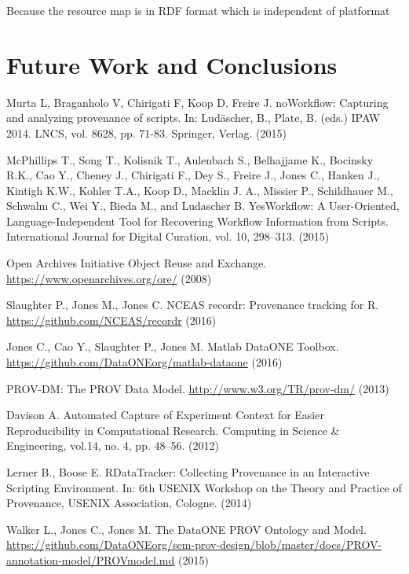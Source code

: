 \documentclass[runningheads,a4paper]{llncs}
\begin{document}
{Because the resource map is in RDF format which is independent of platformat 



\section{Future Work and Conclusions}   \label{future-work-conclusion}




\begin{thebibliography}{4}

 Murta L, Braganholo V, Chirigati F, Koop D, Freire J. noWorkflow: Capturing and analyzing provenance of scripts. In: Lud{\"a}scher, B., Plate, B. (eds.) IPAW 2014. LNCS, vol. 8628,  pp. 71-83. Springer, Verlag. (2015)

 McPhillips T., Song T., Kolisnik T., Aulenbach S., Belhajjame K., Bocinsky R.K., Cao Y., Cheney J., Chirigati F., Dey S., Freire J., Jones C., Hanken J., Kintigh K.W., Kohler T.A., Koop D., Macklin J. A., Missier P., Schildhauer M., Schwalm C., Wei Y., Bieda M., and Ludascher B. YesWorkflow: A User-Oriented, Language-Independent Tool for Recovering Workflow Information from Scripts. International Journal for Digital Curation, vol. 10, 298--313. (2015)

 Open Archives Initiative Object Reuse and Exchange. \url{https://www.openarchives.org/ore/} (2008)

 Slaughter P., Jones M., Jones C. NCEAS recordr: Provenance tracking for R. \url{https://github.com/NCEAS/recordr} (2016)

 Jones C., Cao Y., Slaughter P., Jones M. Matlab DataONE Toolbox. \url{https://github.com/DataONEorg/matlab-dataone} (2016)

 PROV-DM: The PROV Data Model. \url{http://www.w3.org/TR/prov-dm/} (2013)

 Davison A. Automated Capture of Experiment Context for Easier Reproducibility in Computational Research. Computing in Science \& Engineering, vol.14, no. 4, pp. 48--56. (2012)

 Lerner B., Boose E. RDataTracker: Collecting Provenance in an Interactive Scripting Environment. In: 6th USENIX Workshop on the Theory and Practice of Provenance, USENIX Association, Cologne. (2014)

 Walker L., Jones C., Jones M. The DataONE PROV Ontology and Model. \url{https://github.com/DataONEorg/sem-prov-design/blob/master/docs/PROV-annotation-model/PROVmodel.md} (2015)


\end{thebibliography}}
\end{document}
